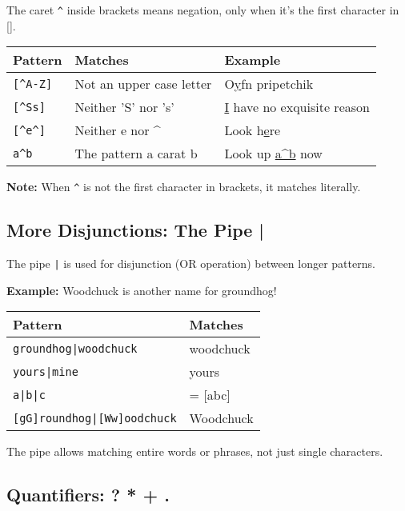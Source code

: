 \documentclass[11pt,a4paper]{article}
\theoremstyle{definition}
\theoremstyle{plain}
\theoremstyle{remark}
\begin{document}
The caret \texttt{\^{}} inside brackets means negation, only when it's the first character in [].
\begin{table}[h]
\centering
\begin{tabular}{|l|l|l|}
\hline
\textbf{Pattern} & \textbf{Matches} & \textbf{Example} \\
\hline
\texttt{[\^{}A-Z]} & Not an upper case letter & O\underline{y}fn pripetchik \\
\hline
\texttt{[\^{}Ss]} & Neither 'S' nor 's' & \underline{I} have no exquisite reason \\
\hline
\texttt{[\^{}e\^{}]} & Neither e nor \^{} & Look h\underline{e}re \\
\hline
\texttt{a\^{}b} & The pattern a carat b & Look up \underline{a\^{}b} now \\
\hline
\end{tabular}
\end{table}

\textbf{Note:} When \texttt{\^{}} is not the first character in brackets, it matches literally.

\subsection{More Disjunctions: The Pipe |}

The pipe \texttt{|} is used for disjunction (OR operation) between longer patterns.

\textbf{Example:} Woodchuck is another name for groundhog!

\begin{table}[h]
\centering
\begin{tabular}{|l|l|}
\hline
\textbf{Pattern} & \textbf{Matches} \\
\hline
\texttt{groundhog|woodchuck} & woodchuck \\
\hline
\texttt{yours|mine} & yours \\
\hline
\texttt{a|b|c} & = [abc] \\
\hline
\texttt{[gG]roundhog|[Ww]oodchuck} & Woodchuck \\
\hline
\end{tabular}
\end{table}

The pipe allows matching entire words or phrases, not just single characters.

\subsection{Quantifiers: ? * + .}
\end{document}

